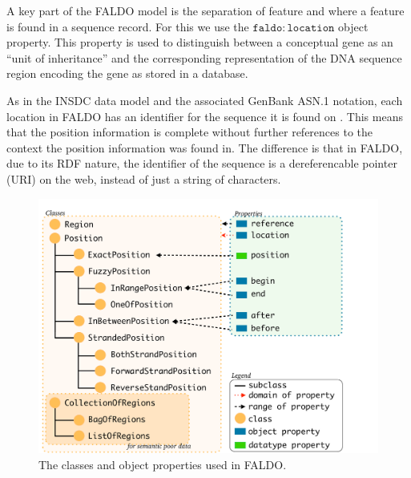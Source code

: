A key part of the FALDO model is the separation of feature and where a feature is found in a sequence record.
For this we use the $\mathtt{faldo\colon{}location}$ object property. 
This property is used to distinguish between a conceptual gene as an ``unit of inheritance'' and the corresponding representation of the DNA sequence region encoding the gene as stored in a database.

As in the INSDC data model and the associated GenBank ASN.1 notation,
each location in FALDO has an identifier for the sequence it is found on \cite{NCBI}.
This means that the position information is complete without further references to the context the position information was found in.
The difference is that in FALDO, due to its RDF nature, the identifier of the sequence is a dereferencable pointer (URI) on the web, instead of just a string of characters.


\begin{figure}
\begin{center}
\includegraphics[width=17cm]{figures/ClassDiagram.pdf}
\end{center}
\caption{The classes and object properties used in FALDO.}
\label{fig:ontology}
\end{figure}

